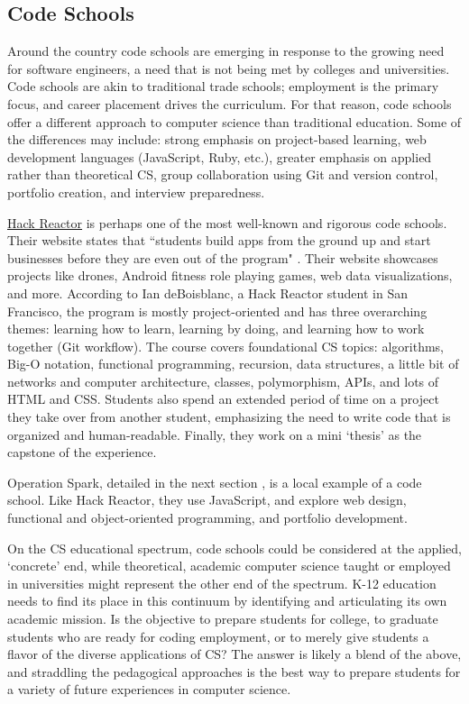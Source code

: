 \subsection{Code Schools}
Around the country code schools are emerging in response to the growing need for software engineers, a need that is not being met by colleges and universities. Code schools are akin to traditional trade schools; employment is the primary focus, and career placement drives the curriculum. For that reason, code schools offer a different approach to computer science than traditional education. Some of the differences may include: strong emphasis on project-based learning, web development languages (JavaScript, Ruby, etc.), greater emphasis on applied rather than theoretical CS, group collaboration using Git and version control, portfolio creation, and interview preparedness. \par 
\href{http://www.hackreactor.com/curriculum}{Hack Reactor} is perhaps one of the most well-known and rigorous code schools. Their website states that ``students build apps from the ground up and start businesses before they are even out of the program" \cite{hackre}. Their website showcases projects like drones, Android fitness role playing games, web data visualizations, and more. According to Ian deBoisblanc, a Hack Reactor student in San Francisco, the program is mostly project-oriented and has three overarching themes: learning how to learn, learning by doing, and learning how to work together (Git workflow). The course covers foundational CS topics: algorithms, Big-O notation, functional programming, recursion, data structures, a little bit of networks and computer architecture, classes, polymorphism, APIs, and lots of HTML and CSS. Students also spend an extended period of time on a project they take over from another student, emphasizing the need to write code that is organized and human-readable. Finally, they work on a mini `thesis' as the capstone of the experience.\par
Operation Spark, detailed in the next section \cite{opspark}, is a local example of a code school. Like Hack Reactor, they use JavaScript, and explore web design, functional and object-oriented programming, and portfolio development.\par
On the CS educational spectrum, code schools could be considered at the applied, `concrete' end, while theoretical, academic computer science taught or employed in universities might represent the other end of the spectrum. K-12 education needs to find its place in this continuum by identifying and articulating its own academic mission. Is the objective to prepare students for college, to graduate students who are ready for coding employment, or to merely give students a flavor of the diverse applications of CS? The answer is likely a blend of the above, and straddling the pedagogical approaches is the best way to prepare students for a variety of future experiences in computer science.\par

